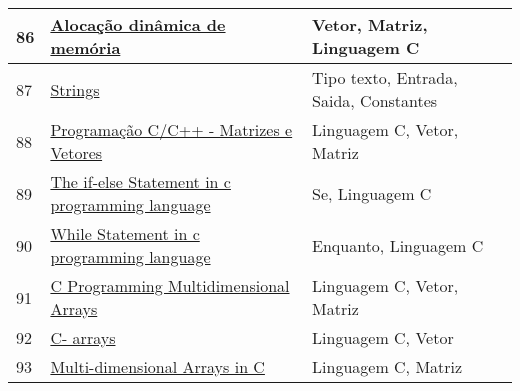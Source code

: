 \begin{longtable}{| p{} | p{} | p{} |}
86  & \href{https://www.ime.usp.br/~pf/algoritmos/aulas/aloca.html}{Alocação dinâmica de memória                                                        } & Vetor, Matriz, Linguagem C                                                                                                                        \\ \hline
87  & \href{https://www.ime.usp.br/~pf/algoritmos/aulas/string.html}{Strings                                                                             } & Tipo texto, Entrada, Saida, Constantes                                                                                                            \\ \hline
88  & \href{https://www.inf.pucrs.br/~pinho/LaproI/Vetores/Vetores.htm}{Programação C/C++ - Matrizes e Vetores                                              } & Linguagem C, Vetor, Matriz                                                                                                                        \\ \hline
89  & \href{https://www.learnconline.com/2010/03/if-else-statement-c-programming-language.html}{The if-else Statement in c programming language                                     } & Se, Linguagem C                                                                                                                                   \\ \hline
90  & \href{https://www.learnconline.com/2010/03/while-loop-statement-in-c.html}{While Statement in c programming language                                           } & Enquanto, Linguagem C                                                                                                                             \\ \hline
91  & \href{https://www.programiz.com/c-programming/c-multi-dimensional-arrays}{C Programming Multidimensional Arrays                                               } & Linguagem C, Vetor, Matriz                                                                                                                        \\ \hline
92  & \href{https://www.tutorialspoint.com/cprogramming/c\_arrays.htm}{C- arrays                                                                           } & Linguagem C, Vetor                                                                                                                                \\ \hline
93  & \href{https://www.tutorialspoint.com/cprogramming/c\_multi\_dimensional\_arrays.htm}{Multi-dimensional Arrays in C                                                       } & Linguagem C, Matriz                                                                                                                               \\ \hline

\end{longtable}
